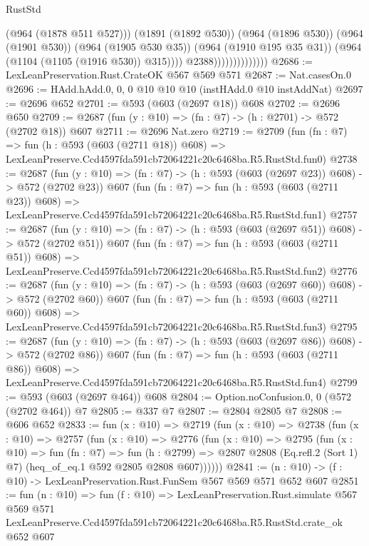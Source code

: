 \begin{lexlean}{RustStd}
\begin{coremodule}
                                      (@964 (@1878 @511 @527)))
                                    (@1891 (@1892 @530))
                                    (@964 (@1896 @530))
                                    (@964 (@1901 @530))
                                    (@964 (@1905 @530 @35))
                                    (@964 (@1910 @195 @35 @31))
                                    (@964 (@1104 (@1105 (@1916 @530)) @315))))
                                @2388))))))))))))))
@2686 := LexLeanPreservation.Rust.CrateOK @567 @569 @571
@2687 := Nat.casesOn.{0}
@2696 := HAdd.hAdd.{0, 0, 0} @10 @10 @10 (instHAdd.{0} @10 instAddNat)
@2697 := @2696 @652
@2701 := @593 (@603 (@2697 @18)) @608
@2702 := @2696 @650
@2709 := @2687 (fun (y : @10) => (fn : @7) -> (h : @2701) -> @572 (@2702 @18)) @607
@2711 := @2696 Nat.zero
@2719 := @2709
    (fun (fn : @7) =>
    fun (h : @593 (@603 (@2711 @18)) @608) =>
    LexLeanPreserve.Ccd4597fda591cb72064221c20c6468ba.R5.RustStd.fun0)
@2738 := @2687
    (fun (y : @10) => (fn : @7) -> (h : @593 (@603 (@2697 @23)) @608) -> @572 (@2702 @23))
    @607
    (fun (fn : @7) =>
    fun (h : @593 (@603 (@2711 @23)) @608) =>
    LexLeanPreserve.Ccd4597fda591cb72064221c20c6468ba.R5.RustStd.fun1)
@2757 := @2687
    (fun (y : @10) => (fn : @7) -> (h : @593 (@603 (@2697 @51)) @608) -> @572 (@2702 @51))
    @607
    (fun (fn : @7) =>
    fun (h : @593 (@603 (@2711 @51)) @608) =>
    LexLeanPreserve.Ccd4597fda591cb72064221c20c6468ba.R5.RustStd.fun2)
@2776 := @2687
    (fun (y : @10) => (fn : @7) -> (h : @593 (@603 (@2697 @60)) @608) -> @572 (@2702 @60))
    @607
    (fun (fn : @7) =>
    fun (h : @593 (@603 (@2711 @60)) @608) =>
    LexLeanPreserve.Ccd4597fda591cb72064221c20c6468ba.R5.RustStd.fun3)
@2795 := @2687
    (fun (y : @10) => (fn : @7) -> (h : @593 (@603 (@2697 @86)) @608) -> @572 (@2702 @86))
    @607
    (fun (fn : @7) =>
    fun (h : @593 (@603 (@2711 @86)) @608) =>
    LexLeanPreserve.Ccd4597fda591cb72064221c20c6468ba.R5.RustStd.fun4)
@2799 := @593 (@603 (@2697 @464)) @608
@2804 := Option.noConfusion.{0, 0} (@572 (@2702 @464)) @7
@2805 := @337 @7
@2807 := @2804 @2805 @7
@2808 := @606 @652
@2833 := fun (x : @10) =>
  @2719
    (fun (x : @10) =>
    @2738
      (fun (x : @10) =>
      @2757
        (fun (x : @10) =>
        @2776
          (fun (x : @10) =>
          @2795
            (fun (x : @10) =>
            fun (fn : @7) =>
            fun (h : @2799) =>
            @2807 @2808 (Eq.refl.{2} (Sort 1) @7) (heq_of_eq.{1} @592 @2805 @2808 @607))))))
@2841 := (n : @10) -> (f : @10) -> LexLeanPreservation.Rust.FunSem @567 @569 @571 @652 @607
@2851 := fun (n : @10) =>
  fun (f : @10) =>
  LexLeanPreservation.Rust.simulate
    @567
    @569
    @571
    LexLeanPreserve.Ccd4597fda591cb72064221c20c6468ba.R5.RustStd.crate_ok
    @652
    @607
\end{coremodule}
\end{lexlean}
